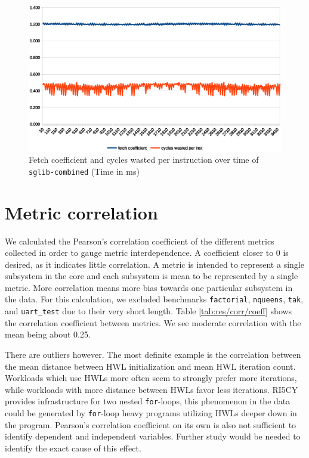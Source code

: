 \documentclass[../bachelor_paper.tex]{subfiles}
\begin{document}
\begin{figure}
    \centering
    \includegraphics[width=\textwidth]{img/graph/embench/sglib-combined_fetch_waste.eps}
    \caption{Fetch coefficient and cycles wasted per instruction over time of \texttt{sglib-combined} (Time in ms)}
    \label{fig:res/sglib/fetch_waste}
\end{figure}

\section{Metric correlation}
We calculated the Pearson's correlation coefficient of the different metrics collected in order to gauge metric interdependence. A coefficient closer to 0 is desired, as it indicates little correlation. A metric is intended to represent a single subsystem in the core and each subsystem is mean to be represented by a single metric. More correlation means more bias towards one particular subsystem in the data. For this calculation, we excluded benchmarks \texttt{factorial}, \texttt{nqueens}, \texttt{tak}, and \texttt{uart\_test} due to their very short length. Table \ref{tab:res/corr/coeff} shows the correlation coefficient between metrics. We see moderate correlation with the mean being about 0.25. 

There are outliers however. The most definite example is the correlation between the mean distance between \ac{HWL} initialization and mean \ac{HWL} iteration count. Workloads which use \acp{HWL} more often seem to strongly prefer more iterations, while workloads with more distance between \acp{HWL} favor less iterations. RI5CY provides infrastructure for two nested \texttt{for}-loops, this phenomenon in the data could be generated by \texttt{for}-loop heavy programs utilizing \acp{HWL} deeper down in the program. Pearson's correlation coefficient on its own is also not sufficient to identify dependent and independent variables. Further study would be needed to identify the exact cause of this effect. 
\end{document}

